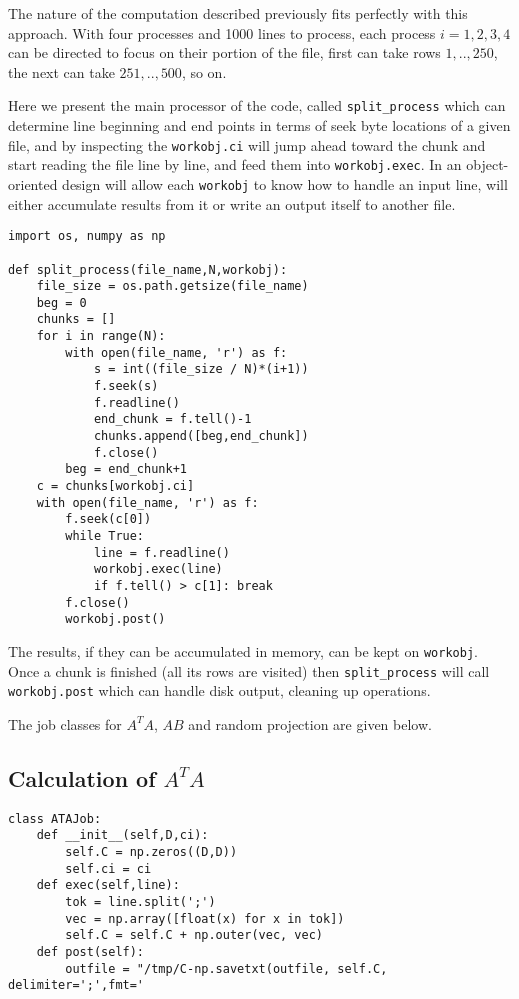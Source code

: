 \documentclass{article}
\begin{document}
The nature of the computation described previously fits perfectly with this
approach. With four processes and 1000 lines to process, each process
$i=1,2,3,4$ can be directed to focus on their portion of the file, first can
take rows $1,..,250$, the next can take $251,..,500$, so on.

Here we present the main processor of the code, called \verb!split_process!
which can determine line beginning and end points in terms of seek byte
locations of a given file, and by inspecting the \verb!workobj.ci! will
jump ahead toward the chunk and start reading the file line by line, and
feed them into \verb!workobj.exec!. In an object-oriented design will allow each
\verb!workobj! to know how to handle an input line, will either accumulate
results from it or write an output itself to another file.

\begin{verbatim}
import os, numpy as np

def split_process(file_name,N,workobj):
    file_size = os.path.getsize(file_name)
    beg = 0
    chunks = []
    for i in range(N):
        with open(file_name, 'r') as f:
            s = int((file_size / N)*(i+1))
            f.seek(s)
            f.readline()
            end_chunk = f.tell()-1
            chunks.append([beg,end_chunk])
            f.close()
        beg = end_chunk+1
    c = chunks[workobj.ci]
    with open(file_name, 'r') as f:
        f.seek(c[0])
        while True:
            line = f.readline()
            workobj.exec(line)
            if f.tell() > c[1]: break
        f.close()
        workobj.post()
\end{verbatim}

The results, if they can be accumulated in memory, can be kept on
\verb!workobj!. Once a chunk is finished (all its rows are visited) then
\verb!split_process! will call \verb!workobj.post! which can handle disk output,
cleaning up operations.

The job classes for $A^T A$, $AB$ and random projection are given below.

\subsection{Calculation of $A^T A$}

\begin{verbatim}
class ATAJob:
    def __init__(self,D,ci):
        self.C = np.zeros((D,D))
        self.ci = ci
    def exec(self,line):
        tok = line.split(';')
        vec = np.array([float(x) for x in tok])
        self.C = self.C + np.outer(vec, vec)
    def post(self):
        outfile = "/tmp/C-np.savetxt(outfile, self.C, delimiter=';',fmt='\end{verbatim}
\end{document}
